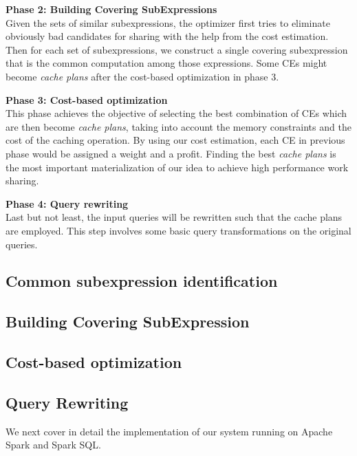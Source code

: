 \textbf{Phase 2: Building Covering SubExpressions}\\
Given the sets of similar subexpressions, the optimizer first tries to eliminate obviously bad candidates for sharing with the help from the cost estimation. Then for each set of subexpressions, we construct a single covering subexpression that is the common computation among those expressions. Some CEs might become \emph{cache plans} after the cost-based optimization in phase 3.

\textbf{Phase 3: Cost-based optimization}\\
This phase achieves the objective of selecting the best combination of CEs which are then become \emph{cache plans}, taking into account the memory constraints and the cost of the caching operation. By using our cost estimation, each CE in previous phase would be assigned a weight and a profit. Finding the best \emph{cache plans} is the most important materialization of our idea to achieve high performance work sharing. 

\textbf{Phase 4: Query rewriting}\\
Last but not least, the input queries will be rewritten such that the cache plans are employed. This step involves some basic query transformations on the original queries.

\subsection{Common subexpression identification}
\label{sec:common_sub}


\subsection{Building Covering SubExpression}
\label{sec:covering_subexpression}


\subsection{Cost-based optimization}
\label{sec:cbo}


\subsection{Query Rewriting}
\label{sec:query_rewriting}


We next cover in detail the implementation of our system running on Apache Spark and Spark SQL.